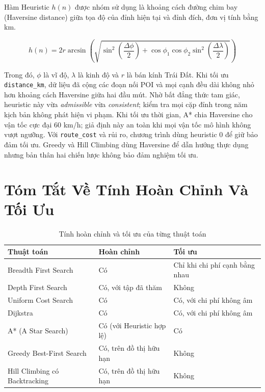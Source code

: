 Hàm Heuristic $h(n)$ được nhóm sử dụng là khoảng cách đường chim bay (Haversine distance) giữa tọa độ của đỉnh hiện tại và đỉnh đích, đơn vị tính bằng km.

\begin{equation}
h(n) = 2r \arcsin\left(\sqrt{\sin^2\left(\frac{\Delta \phi}{2}\right) + \cos\phi_1 \cos\phi_2 \sin^2\left(\frac{\Delta \lambda}{2}\right)}\right)
\end{equation}

Trong đó, $\phi$ là vĩ độ, $\lambda$ là kinh độ và $r$ là bán kính Trái Đất.
Khi tối ưu \texttt{distance\_km}, dữ liệu đã cộng các đoạn nối POI và mọi cạnh
đều dài không nhỏ hơn khoảng cách Haversine giữa hai đầu mút. Nhờ bất đẳng thức
tam giác, heuristic này vừa \emph{admissible} vừa \emph{consistent}; kiểm tra
mọi cặp đỉnh trong năm kịch bản không phát hiện vi phạm. Khi tối ưu thời gian,
A* chia Haversine cho vận tốc cực đại 60 km/h; giả định này an toàn khi mọi vận
tốc mô hình không vượt ngưỡng. Với \texttt{route\_cost} và rủi ro, chương trình
dùng heuristic 0 để giữ bảo đảm tối ưu. Greedy và Hill Climbing dùng Haversine
để dẫn hướng thực dụng nhưng bản thân hai chiến lược không bảo đảm nghiệm tối ưu.

\section{Tóm Tắt Về Tính Hoàn Chỉnh Và Tối Ưu}

\begin{table}[h!]
\centering
\caption{Tính hoàn chỉnh và tối ưu của từng thuật toán}
\small
\begin{tabular}{p{4.2cm}p{3.6cm}p{5.0cm}}
\toprule
Thuật toán & Hoàn chỉnh & Tối ưu \\
\midrule
Breadth First Search & Có & Chỉ khi chi phí cạnh bằng nhau \\
Depth First Search & Có, với tập đã thăm & Không \\
Uniform Cost Search & Có & Có, với chi phí không âm \\
Dijkstra & Có & Có, với chi phí không âm \\
A* (A Star Search) & Có (với Heuristic hợp lệ) & Có \\
Greedy Best-First Search & Có, trên đồ thị hữu hạn & Không \\
Hill Climbing có Backtracking & Có, trên đồ thị hữu hạn & Không \\
\bottomrule
\end{tabular}
\end{table}
